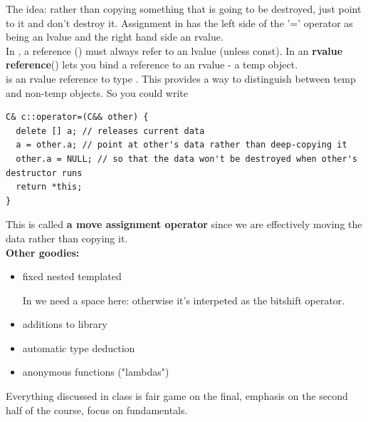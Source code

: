 \documentclass[english, 11pt]{article}
\begin{document}
The idea: rather than copying something that is going to be destroyed, just point to it and don't destroy it. Assignment in  has the left side of the '=' operator as being an lvalue and the right hand side an rvalue. \\

In , a reference (\tc{\&}) must always refer to an lvalue (unless const). In  an \textbf{rvalue reference}(\tc{\&\&}) lets you bind a reference to an rvalue - a temp object. \\

 is an rvalue reference to type . This provides a way to distinguish between temp and non-temp objects. So you could write
\begin{lstlisting}
C& c::operator=(C&& other) {
  delete [] a; // releases current data
  a = other.a; // point at other's data rather than deep-copying it
  other.a = NULL; // so that the data won't be destroyed when other's destructor runs
  return *this;
}
\end{lstlisting}
This is called \textbf{a move assignment operator} since we are effectively moving the data rather than copying it. \\

\textbf{Other  goodies:}

\begin{itemize}
  \item fixed nested templated
  \begin{exmp}
    In  we need a space here:  otherwise it's interpeted as the bitshift operator.
  \end{exmp}
  \item additions to  library
  \item automatic type deduction
  \item anonymous functions ("lambdas")
\end{itemize}

Everything discussed in class is fair game on the final, emphasis on the second half of the course, focus on fundamentals.
\end{document}
